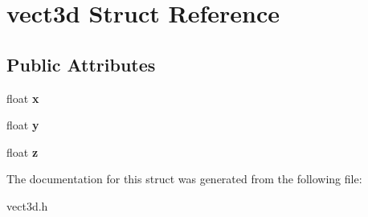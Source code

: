 \hypertarget{structvect3d}{}\section{vect3d Struct Reference}
\label{structvect3d}
\subsection*{Public Attributes}
\begin{DoxyCompactItemize}
\item 
float {\bfseries x}\hypertarget{structvect3d_ada3c36684ff051299782a676537e079f}{}\label{structvect3d_ada3c36684ff051299782a676537e079f}

\item 
float {\bfseries y}\hypertarget{structvect3d_a845755062f2935b56d77a0dd523ffcc3}{}\label{structvect3d_a845755062f2935b56d77a0dd523ffcc3}

\item 
float {\bfseries z}\hypertarget{structvect3d_afdef050787fef9d2ad4d8b14197a67ec}{}\label{structvect3d_afdef050787fef9d2ad4d8b14197a67ec}

\end{DoxyCompactItemize}


The documentation for this struct was generated from the following file\+:\begin{DoxyCompactItemize}
\item 
vect3d.\+h\end{DoxyCompactItemize}
